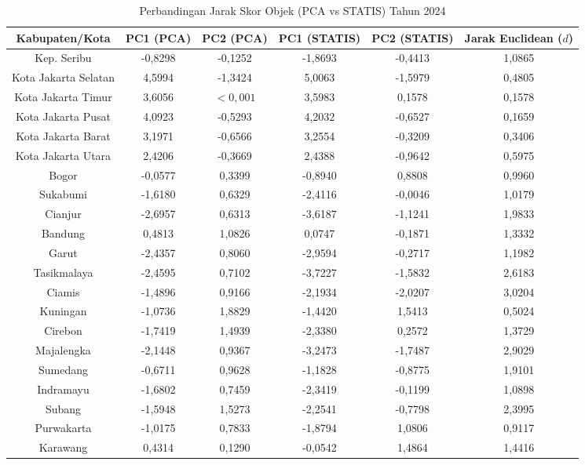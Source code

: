 \begin{table}[H]
\centering
\caption{Perbandingan Jarak Skor Objek (PCA vs STATIS) Tahun 2024} \label{tab:app2jarak_skor_2024}
\begin{adjustbox}{max width=\textwidth, max height=0.85\textheight}
\begin{tabular}{|c|c|c|c|c|c|}
\hline
\textbf{Kabupaten/Kota} & \textbf{PC1 (PCA)} & \textbf{PC2 (PCA)} & \textbf{PC1 (STATIS)} & \textbf{PC2 (STATIS)} & \textbf{Jarak Euclidean ($d$)} \\
\hline
Kep. Seribu & -0,8298 & -0,1252 & -1,8693 & -0,4413 & 1,0865 \\
Kota Jakarta Selatan & 4,5994 & -1,3424 & 5,0063 & -1,5979 & 0,4805 \\
Kota Jakarta Timur & 3,6056 & $< 0,001$ & 3,5983 & 0,1578 & 0,1578 \\
Kota Jakarta Pusat & 4,0923 & -0,5293 & 4,2032 & -0,6527 & 0,1659 \\
Kota Jakarta Barat & 3,1971 & -0,6566 & 3,2554 & -0,3209 & 0,3406 \\
Kota Jakarta Utara & 2,4206 & -0,3669 & 2,4388 & -0,9642 & 0,5975 \\
Bogor & -0,0577 & 0,3399 & -0,8940 & 0,8808 & 0,9960 \\
Sukabumi & -1,6180 & 0,6329 & -2,4116 & -0,0046 & 1,0179 \\
Cianjur & -2,6957 & 0,6313 & -3,6187 & -1,1241 & 1,9833 \\
Bandung & 0,4813 & 1,0826 & 0,0747 & -0,1871 & 1,3332 \\
Garut & -2,4357 & 0,8060 & -2,9594 & -0,2717 & 1,1982 \\
Tasikmalaya & -2,4595 & 0,7102 & -3,7227 & -1,5832 & 2,6183 \\
Ciamis & -1,4896 & 0,9166 & -2,1934 & -2,0207 & 3,0204 \\
Kuningan & -1,0736 & 1,8829 & -1,4420 & 1,5413 & 0,5024 \\
Cirebon & -1,7419 & 1,4939 & -2,3380 & 0,2572 & 1,3729 \\
Majalengka & -2,1448 & 0,9367 & -3,2473 & -1,7487 & 2,9029 \\
Sumedang & -0,6711 & 0,9628 & -1,1828 & -0,8775 & 1,9101 \\
Indramayu & -1,6802 & 0,7459 & -2,3419 & -0,1199 & 1,0898 \\
Subang & -1,5948 & 1,5273 & -2,2541 & -0,7798 & 2,3995 \\
Purwakarta & -1,0175 & 0,7833 & -1,8794 & 1,0806 & 0,9117 \\
Karawang & 0,4314 & 0,1290 & -0,0542 & 1,4864 & 1,4416 \\

\end{tabular}
\end{adjustbox}
\end{table}

